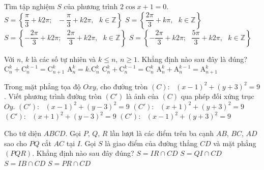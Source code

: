 \begin{ex}%
	Tìm tập nghiệm $S$ của phương trình $2\cos x+1=0$.
	\choice
	{$S=\left\{ \dfrac{\pi}{3}+k2\pi ;\text{ } -\dfrac{\pi}{3}+k2\pi,\text{ } k\in \mathbb{Z} \right\}$}
	{$S=\left\{ \dfrac{2\pi}{3}+k\pi ,\text{ } k\in \mathbb{Z} \right\}$}
	{\True $S=\left\{ -\dfrac{2\pi}{3}+k2\pi ;\text{ } \dfrac{2\pi}{3}+k2\pi,\text{ } k\in \mathbb{Z} \right\}$}
	{$S=\left\{ -\dfrac{2\pi}{3}+k2\pi ;\text{ } \dfrac{5\pi}{3}+k2\pi,\text{ } k\in \mathbb{Z} \right\}$}
\end{ex}
\begin{ex}%
	Với $n$, $k$ là các số tự nhiên và $k\le n$, $n\ge 1$. Khẳng định nào sau đây là đúng?
	\choice
	{\True $\mathrm{C}_n^k+\mathrm{C}_n^{k-1}=\mathrm{C}_{n+1}^k$}
	{$\mathrm{A}_n^k=k.\mathrm{C}_n^k$}
	{$\mathrm{C}_n^k+\mathrm{C}_n^{k-1}=\mathrm{C}_n^k$}
	{$\mathrm{A}_n^k+\mathrm{A}_n^{k-1}=\mathrm{A}_{n+1}^k$}
\end{ex}
\begin{ex}%
	Trong mặt phẳng tọa độ $Oxy$, cho đường tròn $(C):\text{ }{(x-1)^2}+{(y+3)^2}=9$. Viết phương trình đường tròn $(C')$ là ảnh của $(C)$ qua phép đối xứng trục $Oy$.
	\choice
{$(C'):\text{ }(x-1)^2+(y-3)^2=9$}
{\True $(C'):\text{ }(x+1)^2+(y+3)^2=9$}
{$(C'):\text{ }(x+1)^2+(y-3)^2=9$}
{$(C'):\text{ }(x-1)^2+(y+3)^2=9$}
\end{ex}
\begin{ex}%
	Cho tứ diện $ABCD$. Gọi $P$, $Q$, $R$ lần lượt là các điểm trên ba cạnh $AB$, $BC$, $AD$ sao cho $PQ$ cắt $AC$ tại $I$. Gọi $S$ là giao điểm của đường thẳng $CD$ và mặt phẳng $(PQR)$. Khẳng định nào sau đây đúng?
\choice
{\True $S=IR\cap CD$}
{$S=QI\cap CD$}
{$S=IB\cap CD$}
{$S=PR\cap CD$}
\end{ex}
